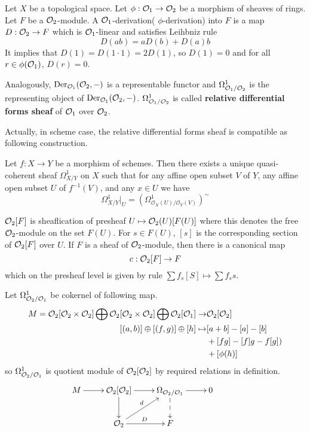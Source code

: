 \begin{mydefn}
Let $X$ be a topological space. Let $\phi: \mathcal{O}_{1} \rightarrow \mathcal{O}_{2}$ be a morphism of sheaves of rings. Let $F$ be a $\mathcal{O}_{2}$-module. A $\mathcal{O}_1$-derivation( $\phi$-derivation) into $F$ is a map $D: \mathcal{O}_2 \rightarrow F$ which is $\mathcal{O}_1$-linear and satisfies Leihbniz rule
\[
D(ab)=aD(b)+D(a)b
\]
It implies that $D(1)=D(1\cdot 1)=2D(1)$, so $D(1)=0$ and for all $r \in \phi(\mathcal{O}_1)$, $D(r)=0$.
\par
Analogously, $\text{Der}_{\mathcal{O}_1}(\mathcal{O}_2,-)$ is a representable functor and $\Omega_{\mathcal{O}_1/\mathcal{O}_2}^1$ is the representing object of $\text{Der}_{\mathcal{O}_1}(\mathcal{O}_2,-)$. $\Omega_{\mathcal{O}_1/\mathcal{O}_2}^1$ is called \textbf{relative differential forms sheaf} of $\mathcal{O}_1$ over $\mathcal{O}_2$.
\end{mydefn}
Actually, in scheme case, the relative differential forms sheaf is compatible as following construction.
\begin{prop}
Let $f: X \rightarrow Y$ be a morphism of schemes. Then there exists a unique quasi-coherent sheaf $\Omega_{X/Y}^1$ on $X$ such that for any affine open subset $V$ of $Y$, any affine open subset $U$ of $ f^{-1}(V)$, and any $x \in U$ we have
\[
\Omega_{X/Y}^{1}|_{U}= (\Omega^{1}_{\mathcal{O}_{X}(U)/\mathcal{O}_{Y}(V)})^{\sim}
\]
\end{prop}
$\mathcal{O}_{2}[F]$ is sheaflication of presheaf $U \mapsto \mathcal{O}_{2}(U)[F(U)]$ where this denotes the free $\mathcal{O}_{2}$-module on the set $F(U)$. For $s \in F(U)$, $[s]$ is the corresponding section of $\mathcal{O}_{2}[F]$ over $U$. If $F$ is a sheaf of $\mathcal{O}_2$-module, then there is a canonical map
\[
c: \mathcal{O}_2 [F] \rightarrow F
\]
which on the presheaf level is given by rule $\sum f_{s}[S] \mapsto \sum f_{s}s$.
\par
Let $\Omega_{\mathcal{O}_{2}/\mathcal{O}_{1}}^{1}$ be cokernel of following map.
\begin{align*}
	M= \mathcal{O}_{2}[\mathcal{O}_{2} \times \mathcal{O}_{2}] \bigoplus \mathcal{O}_{2}[\mathcal{O}_{2} \times \mathcal{O}_{2}] \bigoplus \mathcal{O}_{2}[\mathcal{O}_{1}] \rightarrow& \mathcal{O}_{2}[\mathcal{O}_{2}]\\
	[(a,b)] \oplus [(f,g)] \oplus [h] \mapsto& [a+b] - [a]-[b]\\
	&+[fg]-[f]g-f[g]) \\
	&+[\phi(h)]
\end{align*}
so $\Omega_{\mathcal{O}_2/\mathcal{O}_1}^1$ is quotient module of $\mathcal{O}_2[\mathcal{O}_2]$ by required relations in definition.
\[
\xymatrix{
M \ar[r] &\sheaf_2[\sheaf_2] \ar[r] \ar[d]& \Omega_{\sheaf_2/\sheaf_1} \ar[r] \ar@{-->}[d] &0 &\\
& \sheaf_2 \ar[ru]^{d}
 \ar[r]^{D} & F &   &
}
\]
